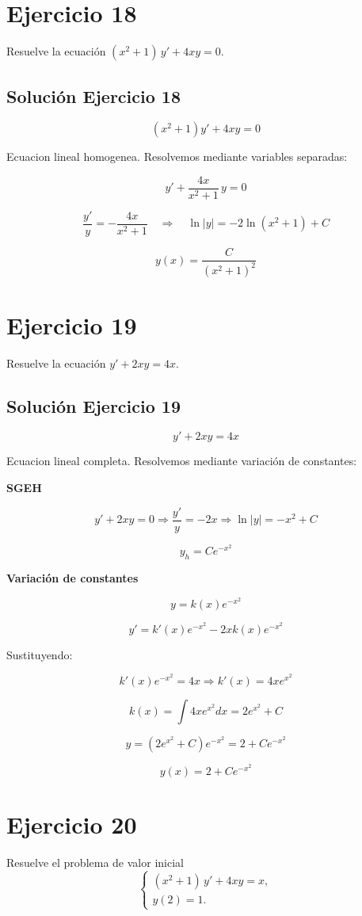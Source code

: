 \documentclass[12pt]{article}
\begin{document}
\section*{Ejercicio 18}
Resuelve la ecuación $(x^2 + 1)\,y' + 4xy = 0$.

\subsection*{Solución Ejercicio 18}

\[
(x^2+1)y' + 4xy = 0
\]

Ecuacion lineal homogenea. Resolvemos mediante variables separadas:

\[
y' + \frac{4x}{x^2+1}\,y = 0
\]

\[
\frac{y'}{y} = -\frac{4x}{x^2+1}
\quad\Rightarrow\quad
\ln|y| = -2\ln(x^2+1) + C
\]

\[
\boxed{y(x) = \frac{C}{(x^2+1)^2}}
\]

\section*{Ejercicio 19}
Resuelve la ecuación $y' + 2xy = 4x$.

\subsection*{Solución Ejercicio 19}

\[
y' + 2xy = 4x
\]

Ecuacion lineal completa. Resolvemos mediante variación de constantes:

\textbf{SGEH}

\[
y' + 2xy = 0
\Rightarrow
\frac{y'}{y} = -2x
\Rightarrow
\ln|y| = -x^2 + C
\]

\[
y_h = C e^{-x^2}
\]

\textbf{Variación de constantes}

\[
y = k(x)e^{-x^2}
\]

\[
y' = k'(x)e^{-x^2} - 2xk(x)e^{-x^2}
\]

Sustituyendo:

\[
k'(x)e^{-x^2} = 4x
\Rightarrow
k'(x) = 4x e^{x^2}
\]

\[
k(x) = \int 4x e^{x^2} dx = 2 e^{x^2} + C
\]

\[
y = (2e^{x^2}+C)e^{-x^2} = 2 + C e^{-x^2}
\]

\[
\boxed{\,y(x) = 2 + C e^{-x^2}\,}
\]

\section*{Ejercicio 20}
Resuelve el problema de valor inicial
\[
\begin{cases}
(x^2 + 1)\,y' + 4xy = x, \\
y(2) = 1.
\end{cases}
\]
\end{document}
